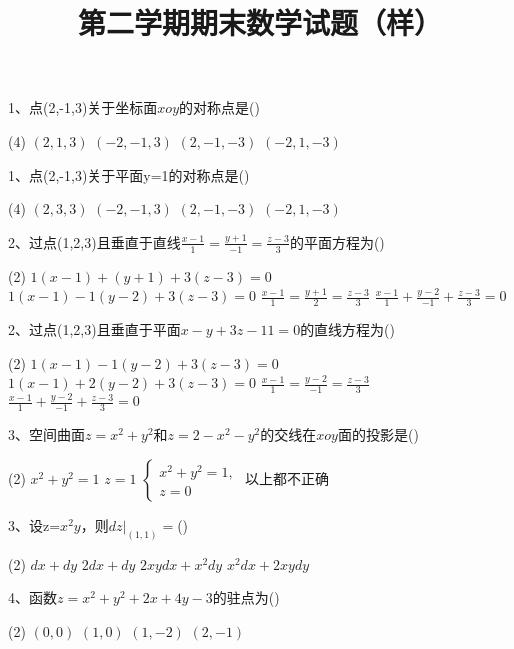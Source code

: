 \documentclass[12pt,a3paper]{article}
\title{第二学期期末数学试题（样）}
\date{}
\begin{document}
\maketitle



1、点(2,-1,3)关于坐标面$xoy$的对称点是\hfill(\qquad)
\begin{tasks}(4)
    \task $(2,1,3)$
    \task $(-2,-1,3)$
    \task $(2,-1,-3)$
    \task $(-2,1,-3)$
    \\
\end{tasks}
1、点(2,-1,3)关于平面y=1的对称点是\hfill(\qquad)
\begin{tasks}(4)
    \task $(2,3,3)$
    \task $(-2,-1,3)$
    \task $(2,-1,-3)$
    \task $(-2,1,-3)$
    \\
\end{tasks}
2、过点(1,2,3)且垂直于直线$\frac{x-1}{1}=\frac{y+1}{-1}=\frac{z-3}{3}$的平面方程为\hfill(\qquad)
\begin{tasks}(2)
    \task $1(x-1)+(y+1)+3(z-3)=0$
    \task $1(x-1)-1(y-2)+3(z-3)=0$
    \task $\frac{x-1}{1}=\frac{y+1}{2}=\frac{z-3}{3}$
    \task $\frac{x-1}{1}+\frac{y-2}{-1}+\frac{z-3}{3}=0$
    \\
\end{tasks}
2、过点(1,2,3)且垂直于平面$x-y+3z-11=0$的直线方程为\hfill(\qquad)
\begin{tasks}(2)
    \task $1(x-1)-1(y-2)+3(z-3)=0$
    \task $1(x-1)+2(y-2)+3(z-3)=0$
    \task $\frac{x-1}{1}=\frac{y-2}{-1}=\frac{z-3}{3}$
    \\
    \task $\frac{x-1}{1}+\frac{y-2}{-1}+\frac{z-3}{3}=0$
\end{tasks}
3、空间曲面$z=x^2+y^2$和$z=2-x^2-y^2$的交线在$xoy$面的投影是\hfill(\qquad)
\begin{tasks}(2)
    \task $x^2+y^2=1$
    \task $z=1$
    \task $
    \begin{cases}
        x^2+y^2=1,\\
        z=0
    \end{cases}$
    \task 以上都不正确
    \\
\end{tasks}
3、设z=$x^2y$，则$dz|_{(1,1)}=$\hfill(\qquad)
\begin{tasks}(2)
    \task $dx+dy$
    \task $2dx+dy$
    \task $2xydx+x^2dy$
    \task $x^2dx+2xydy$
    \\
\end{tasks}
4、函数$z=x^2+y^2+2x+4y-3$的驻点为\hfill(\qquad)
\begin{tasks}(2)
    \task $(0,0)$
    \task $(1,0)$
    \task $(1,-2)$
    \task $(2,-1)$
    \\
\end{tasks}
\end{document}

